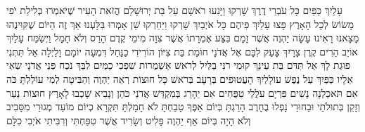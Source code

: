 \documentclass[../main/main.tex]{subfiles}
\begin{document}
\begin{multicols}{\ncols}
עָלַיִךְ כַּפַּיִם כָּל עֹבְרֵי דֶרֶךְ שָׁרְקוּ וַיָּנִעוּ רֹאשָׁם עַל בַּת יְרוּשָׁלֵם הֲזֹאת הָעִיר שֶׁיֹּאמְרוּ כְּלִילַת יֹפִי מָשׂוֹשׂ לְכָל הָאָרֶץ \ClosedSection{}פָּצוּ עָלַיִךְ פִּיהֶם כָּל אֹיְבַיִךְ שָׁרְקוּ וַיַּחַרְקוּ שֵׁן אָמְרוּ בִּלָּעְנוּ אַךְ זֶה הַיּוֹם שֶׁקִּוִּינֻהוּ מָצָאנוּ רָאִינוּ \ClosedSection{}עָשָׂה יַהְוֶה אֲשֶׁר זָמָם בִּצַּע אֶמְרָתוֹ אֲשֶׁר צִוָּה מִימֵי קֶדֶם הָרַס וְלֹא חָמָל וַיְשַׂמַּח עָלַיִךְ אוֹיֵב הֵרִים קֶרֶן צָרָיִךְ \ClosedSection{}צָעַק לִבָּם אֶל אֲדֹנָי חוֹמַת בַּת צִיּוֹן הוֹרִידִי כַנַּחַל דִּמְעָה יוֹמָם וָלַיְלָה אַל תִּתְּנִי פוּגַת לָךְ אַל תִּדֹּם בַּת עֵינֵךְ \ClosedSection{}קוּמִי רֹנִּי בַלַּיִל לְרֹאשׁ אַשְׁמֻרוֹת שִׁפְכִי כַמַּיִם לִבֵּךְ נֹכַח פְּנֵי אֲדֹנָי שְׂאִי אֵלָיו כַּפַּיִךְ עַל נֶפֶשׁ עוֹלָלַיִךְ הָעֲטוּפִים בְּרָעָב בְּרֹאשׁ כָּל חוּצוֹת \ClosedSection{}רְאֵה יַהְוֶה וְהַבִּיטָה לְמִי עוֹלַלְתָּ כֹּה אִם תֹּאכַלְנָה נָשִׁים פִּרְיָם עֹלֲלֵי טִפֻּחִים אִם יֵהָרֵג בְּמִקְדַּשׁ אֲדֹנַי כֹּהֵן וְנָבִיא \ClosedSection{}שָׁכְבוּ לָאָרֶץ חוּצוֹת נַעַר וְזָקֵן בְּתוּלֹתַי וּבַחוּרַי נָפְלוּ בֶחָרֶב הָרַגְתָּ בְּיוֹם אַפֶּךָ טָבַחְתָּ לֹא חָמָלְתָּ \ClosedSection{}תִּקְרָא כְיוֹם מוֹעֵד מְגוּרַי מִסָּבִיב וְלֹא הָיָה בְּיוֹם אַף יַהְוֶה פָּלִיט וְשָׂרִיד אֲשֶׁר טִפַּחְתִּי וְרִבִּיתִי אֹיְבִי כִלָּם\OpenSection{}\par

\end{multicols}
\end{document}
